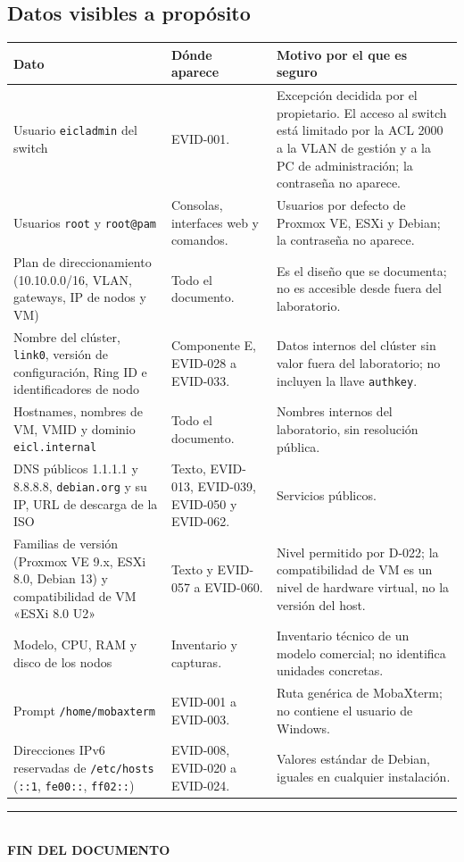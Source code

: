 \documentclass[11pt,a4paper]{article}
\newcommand{\cab}{\rowcolor{light}}
\begin{document}
\subsection{Datos visibles a propósito}
{\small
\begin{longtable}{L{3.4cm} L{6.0cm} L{5.6cm}}
  \toprule
  \cab\textbf{Dato} & \textbf{Dónde aparece} & \textbf{Motivo por el que es seguro}\\
  \midrule
  \endhead
  Usuario \texttt{eicladmin} del switch & EVID-001. & Excepción decidida por el propietario. El acceso al switch está limitado por la ACL 2000 a la VLAN de gestión y a la PC de administración; la contraseña no aparece.\\
  Usuarios \texttt{root} y \texttt{root@pam} & Consolas, interfaces web y comandos. & Usuarios por defecto de Proxmox VE, ESXi y Debian; la contraseña no aparece.\\
  Plan de direccionamiento (10.10.0.0/16, VLAN, gateways, IP de nodos y VM) & Todo el documento. & Es el diseño que se documenta; no es accesible desde fuera del laboratorio.\\
  Nombre del clúster, \texttt{link0}, versión de configuración, Ring ID e identificadores de nodo & Componente E, EVID-028 a EVID-033. & Datos internos del clúster sin valor fuera del laboratorio; no incluyen la llave \texttt{authkey}.\\
  Hostnames, nombres de VM, VMID y dominio \texttt{eicl.internal} & Todo el documento. & Nombres internos del laboratorio, sin resolución pública.\\
  DNS públicos 1.1.1.1 y 8.8.8.8, \texttt{debian.org} y su IP, URL de descarga de la ISO & Texto, EVID-013, EVID-039, EVID-050 y EVID-062. & Servicios públicos.\\
  Familias de versión (Proxmox VE 9.x, ESXi 8.0, Debian 13) y compatibilidad de VM «ESXi 8.0 U2» & Texto y EVID-057 a EVID-060. & Nivel permitido por D-022; la compatibilidad de VM es un nivel de hardware virtual, no la versión del host.\\
  Modelo, CPU, RAM y disco de los nodos & Inventario y capturas. & Inventario técnico de un modelo comercial; no identifica unidades concretas.\\
  Prompt \texttt{/home/mobaxterm} & EVID-001 a EVID-003. & Ruta genérica de MobaXterm; no contiene el usuario de Windows.\\
  Direcciones IPv6 reservadas de \texttt{/etc/hosts} (\texttt{::1}, \texttt{fe00::}, \texttt{ff02::}) & EVID-008, EVID-020 a EVID-024. & Valores estándar de Debian, iguales en cualquier instalación.\\
  \bottomrule
\end{longtable}
}

\begin{center}
  \vspace{-2pt}
  {\color{navy}\rule{0.5\textwidth}{0.6pt}}\\[4pt]
  {\sffamily\bfseries\color{navy}FIN DEL DOCUMENTO}
\end{center}
\end{document}
